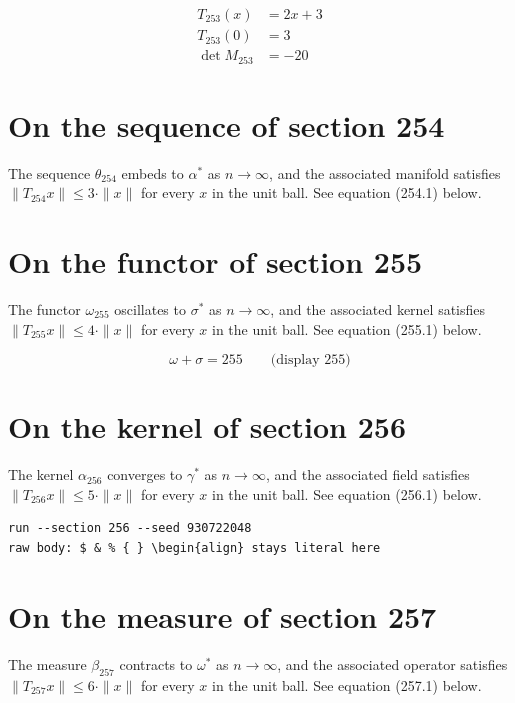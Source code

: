 \documentclass{article}
\begin{document}
\begin{align}
T_{253}(x) &= 2 x + 3 \\
T_{253}(0) &= 3 \\
\det M_{253} &= -20
\end{align}

\section{On the sequence of section 254}
The sequence $\theta_{254}$ embeds to $\alpha^{*}$ as $n \to \infty$,
and the associated manifold satisfies $\|T_{254} x\| \leq 3 \cdot \|x\|$
for every $x$ in the unit ball. See equation (254.1) below.

\section{On the functor of section 255}
The functor $\omega_{255}$ oscillates to $\sigma^{*}$ as $n \to \infty$,
and the associated kernel satisfies $\|T_{255} x\| \leq 4 \cdot \|x\|$
for every $x$ in the unit ball. See equation (255.1) below.

$$
\omega + \sigma = 255 \qquad \text{(display 255)}
$$

\section{On the kernel of section 256}
The kernel $\alpha_{256}$ converges to $\gamma^{*}$ as $n \to \infty$,
and the associated field satisfies $\|T_{256} x\| \leq 5 \cdot \|x\|$
for every $x$ in the unit ball. See equation (256.1) below.

\begin{verbatim}
run --section 256 --seed 930722048
raw body: $ & % { } \begin{align} stays literal here
\end{verbatim}

\section{On the measure of section 257}
The measure $\beta_{257}$ contracts to $\omega^{*}$ as $n \to \infty$,
and the associated operator satisfies $\|T_{257} x\| \leq 6 \cdot \|x\|$
for every $x$ in the unit ball. See equation (257.1) below.
\end{document}
